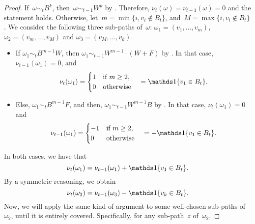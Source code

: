 \documentclass{article}
\begin{document}
\begin{proof}
    If~$\omega \sim_t B^k$, then~$\omega \sim_{t-1} W^{k}$ by . Therefore, $\nu_{t}(\omega) = \nu_{t-1}(\omega) = 0$ and the statement holds.
    Otherwise, let~$m = \min \{i, v_i \notin B_t \}$, and~$M = \max \{i, v_i \notin B_t \}$.
    We consider the following three sub-paths of~$\omega$: $\omega_1 = (v_1,\ldots,v_m)$, $\omega_2 = (v_m,\ldots,v_M)$ and $\omega_3 = (v_M,\ldots,v_k)$.
    \begin{itemize}
        \item If $\omega_1 \sim_t B^{m-1}W$, then $\omega_1 \sim_{t-1} W^{m-1} \cdot (W+F)$ by . In that case, $\nu_{t-1}(\omega_1) = 0$, and
        \begin{equation*}
            \nu_t(\omega_1) = \begin{cases}
                1 & \text{if } m \geq 2, \\
                0 & \text{otherwise}
            \end{cases} \quad = \bbOne\{v_1 \in B_t\}.
        \end{equation*}
        \item Else, $\omega_1 \sim_t B^{m-1}F$, and then, $\omega_1 \sim_{t-1} W^{m-1} B$ by . In that case, $\nu_t(\omega_1) = 0$ and
        \begin{equation*}
            \nu_{t-1}(\omega_1) = \begin{cases}
                -1 & \text{if } m \geq 2, \\
                0 & \text{otherwise}
            \end{cases} \quad = -\bbOne\{v_1 \in B_t\}.
        \end{equation*}
    \end{itemize}
    In both cases, we have that
    \begin{equation} \label{eq:prefix_subpath}
        \nu_t(\omega_1) = \nu_{t-1}(\omega_1) + \bbOne\{v_1 \in B_t\}.
    \end{equation}
    By a symmetric reasoning, we obtain
    \begin{equation} \label{eq:suffix_subpath}
        \nu_t(\omega_3) = \nu_{t-1}(\omega_3) - \bbOne\{v_k \in B_t\}.
    \end{equation}
    Now, we will apply the same kind of argument to some well-chosen sub-paths of~$\omega_2$, until it is entirely covered.
    Specifically, for any sub-path~$z$ of~$\omega_2$,

\end{proof}
\end{document}
